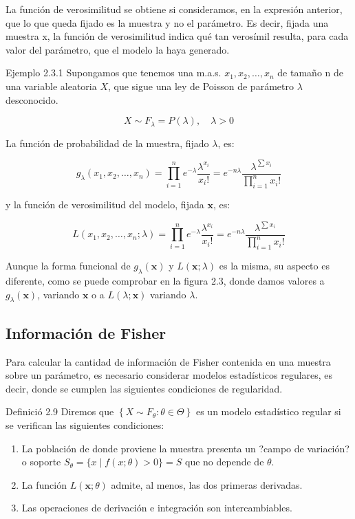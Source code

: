 \documentclass[
]{article}
\providecommand{\tightlist}{%
  \setlength{\itemsep}{0pt}\setlength{\parskip}{0pt}}
\begin{document}
La función de verosimilitud se obtiene si consideramos, en la expresión anterior, que lo que queda fijado es la muestra y no el parámetro. Es decir, fijada una muestra x, la función de verosimilitud indica qué tan verosímil resulta, para cada valor del parámetro, que el modelo la haya generado.

Ejemplo 2.3.1 Supongamos que tenemos una m.a.s. \(x_{1}, x_{2}, \ldots, x_{n}\) de tamaño n de una variable aleatoria \(X\), que sigue una ley de Poisson de parámetro \(\lambda\) desconocido.

\[
X \sim F_{\lambda}=P(\lambda), \quad \lambda>0
\]

La función de probabilidad de la muestra, fijado \(\lambda\), es:

\[
g_{\lambda}\left(x_{1}, x_{2}, \ldots, x_{n}\right)=\prod_{i=1}^{n} e^{-\lambda} \frac{\lambda^{x_{i}}}{x_{i}!}=e^{-n \lambda} \frac{\lambda^{\sum x_{i}}}{\prod_{i=1}^{n} x_{i}!}
\]

y la función de verosimilitud del modelo, fijada \(\mathbf{x}\), es:

\[
L\left(x_{1}, x_{2}, \ldots, x_{n} ; \lambda\right)=\prod_{i=1}^{n} e^{-\lambda} \frac{\lambda^{x_{i}}}{x_{i}!}=e^{-n \lambda} \frac{\lambda^{\sum x_{i}}}{\prod_{i=1}^{n} x_{i}!}
\]

Aunque la forma funcional de \(g_{\lambda}(\mathbf{x})\) y \(L(\mathbf{x} ; \lambda)\) es la misma, su aspecto es diferente, como se puede comprobar en la figura 2.3, donde damos valores a \(g_{\lambda}(\mathbf{x})\), variando \(\mathbf{x}\) o a \(L(\lambda ; \mathbf{x})\) variando \(\lambda\).

\subsection{Información de Fisher}\label{informaciuxf3n-de-fisher}

Para calcular la cantidad de información de Fisher contenida en una muestra sobre un parámetro, es necesario considerar modelos estadísticos regulares, es decir, donde se cumplen las siguientes condiciones de regularidad.

Definició 2.9 Diremos que \(\left\{X \sim F_{\theta}: \theta \in \Theta\right\}\) es un modelo estadístico regular si se verifican las siguientes condiciones:

\begin{enumerate}
\def\labelenumi{\arabic{enumi}.}
\tightlist
\item
  La población de donde proviene la muestra presenta un ?campo de variación? o soporte \(S_{\theta}=\{x \mid f(x ; \theta)>0\}=S\) que no depende de \(\theta\).
\item
  La función \(L(\mathbf{x} ; \theta)\) admite, al menos, las dos primeras derivadas.
\item
  Las operaciones de derivación e integración son intercambiables.
\end{enumerate}
\end{document}
